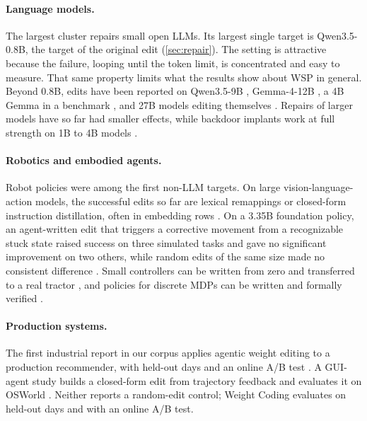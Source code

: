\paragraph{Language models.} The largest cluster repairs small open LLMs. Its largest single target is Qwen3.5-0.8B, the target of the original edit (\cref{sec:repair}). The setting is attractive because the failure, looping until the token limit, is concentrated and easy to measure. That same property limits what the results show about WSP in general. Beyond 0.8B, edits have been reported on Qwen3.5-9B \citep{ax2611_09382}, Gemma-4-12B \citep{zen24156363}, a 4B Gemma in a benchmark \citep{ax2611_08647}, and 27B models editing themselves \citep{ax2611_21885,ax2611_29513,ax2611_31117}. Repairs of larger models have so far had smaller effects, while backdoor implants work at full strength on 1B to 4B models \citep{ax2611_27920,ax2611_27425}.

\paragraph{Robotics and embodied agents.} Robot policies were among the first non-LLM targets. On large vision-language-action models, the successful edits so far are lexical remappings or closed-form instruction distillation, often in embedding rows \citep{ax2611_09376,ax2611_11894}. On a 3.35B foundation policy, an agent-written edit that triggers a corrective movement from a recognizable stuck state raised success on three simulated tasks and gave no significant improvement on two others, while random edits of the same size made no consistent difference \citep{ax2611_31715}. Small controllers can be written from zero and transferred to a real tractor \citep{ax2611_21958}, and policies for discrete MDPs can be written and formally verified \citep{ax2611_11604}.

\paragraph{Production systems.} The first industrial report in our corpus applies agentic weight editing to a production recommender, with held-out days and an online A/B test \citep{ax2611_29613}. A GUI-agent study builds a closed-form edit from trajectory feedback and evaluates it on OSWorld \citep{ax2611_32332}. Neither reports a random-edit control; Weight Coding evaluates on held-out days and with an online A/B test.


